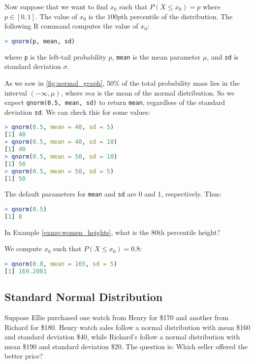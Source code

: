 Now suppose that we want to find \( x_0 \) such that \( P(X \leq x_0) = p \) where \( p \in [0, 1] \).
The value of \( x_0 \) is the \( 100p \)th percentile of the distribution.
The following R command computes the value of \( x_0 \):
\begin{lstlisting}[language=R]
> qnorm(p, mean, sd)
\end{lstlisting}
where \verb|p| is the left-tail probability  \( p \), \verb|mean| is the mean parameter \( \mu \), and \verb|sd| is standard deviation \( \sigma \).
\begin{exmp}
    As we saw in \autoref{fig:normal_graph}, 50\% of the total probability mass lies in the interval \( (-\infty, \mu) \), where \( mu \) is the mean of the normal distribution.
    So we expect \verb|qnorm(0.5, mean, sd)| to return \verb|mean|, regardless of the standard deviation \verb|sd|.
    We can check this for some values:
    \begin{lstlisting}[language=R]
> qnorm(0.5, mean = 40, sd = 5)
[1] 40
> qnorm(0.5, mean = 40, sd = 10)
[1] 40
> qnorm(0.5, mean = 50, sd = 10)
[1] 50
> qnorm(0.5, mean = 50, sd = 5)
[1] 50
    \end{lstlisting}
    The default parameters for \verb|mean| and \verb|sd| are 0 and 1, respectively. Thus:
    \begin{lstlisting}[language=R]
> qnorm(0.5)
[1] 0
    \end{lstlisting}
\end{exmp}
\begin{exmp}
    In Example \autoref{exmp:women_heights}, what is the 80th percentile height?
\end{exmp}
\begin{solution}
    We compute \( x_0 \) such that \( P(X \leq x_0) = 0.8 \):
    \begin{lstlisting}[language=R]
> qnorm(0.8, mean = 165, sd = 5)
[1] 169.2081        
    \end{lstlisting}
\end{solution}

\subsection{Standard Normal Distribution}

Suppose Ellie purchased one watch from Henry for \$170 and another from Richard for \$180.
Henry watch sales follow a normal distribution with mean \$160 and standard deviation \$40,
while Richard's follow a normal distribution with mean \$190 and standard deviation \$20.
The question is: Which seller offered the better price?

